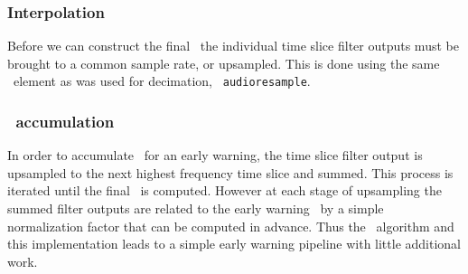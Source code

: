 \subsubsection{Interpolation}

Before we can construct the final \SNR\, the individual time slice filter
outputs must be brought to a common sample rate, or upsampled.  This is done
using the same \gstreamer\ element as was used for decimation, {\tt
audioresample}.  

\subsubsection{\SNR\ accumulation}

In order to accumulate \SNR\ for an early warning, the time slice filter
output is upsampled to the next highest frequency time slice and summed. This
process is iterated until the final \SNR\ is computed.  However at each stage
of upsampling the summed filter outputs are related to the early warning \SNR\
by a simple normalization factor that can be computed in advance. Thus the
\lloid\ algorithm and this implementation leads to a simple early warning
pipeline with little additional work.


